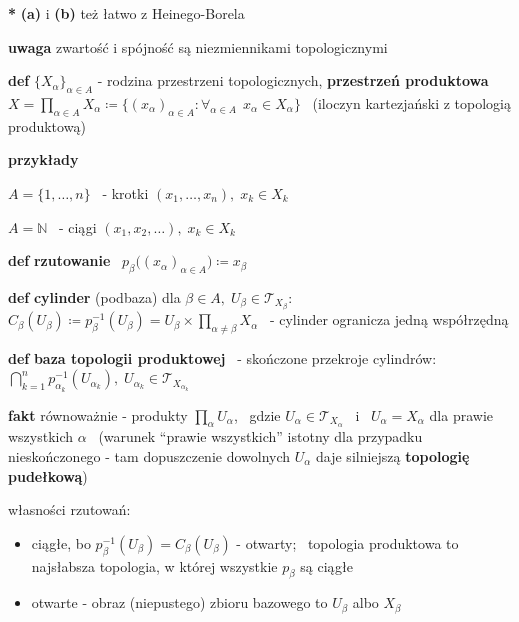 \documentclass[a4paper,12pt]{article}
\begin{document}
\bigskip
\textbf{*} \; \textbf{(a)} i \textbf{(b)} też łatwo z Heinego-Borela

\smallskip
\textbf{uwaga} \; zwartość i spójność są niezmiennikami topologicznymi


\newpage
{}

\smallskip
\textbf{def} \; \(\{X_\alpha\}_{\alpha \in A}\) - rodzina przestrzeni topologicznych, \; \textbf{przestrzeń produktowa} \, \(X = \prod_{\alpha \in A} X_\alpha \coloneqq \{(x_\alpha)_{\alpha \in A} : \forall_{\alpha \in A} \;\, x_\alpha \in X_\alpha\}\) \, (iloczyn kartezjański z topologią produktową)

\bigskip
\begin{logbox}
\textbf{przykłady}
\begin{steps}
    \item \(A = \{1, \dots, n\}\) \, - krotki \((x_1, \dots, x_n), \; x_k \in X_k\)
    \item \(A = \mathbb{N}\) \, - ciągi \((x_1, x_2, \dots), \; x_k \in X_k\)
\end{steps}
\end{logbox}

\bigskip
\textbf{def} \; \textbf{rzutowanie} \, \(p_\beta\big((x_\alpha)_{\alpha \in A}\big) \coloneqq x_\beta\)

\smallskip
\textbf{def} \; \textbf{cylinder} (podbaza) dla \(\beta \in A, \; U_\beta \in \mathcal{T}_{X_\beta}\): \, \(C_\beta(U_\beta) \coloneqq p_\beta^{-1}(U_\beta) = U_\beta \times \prod_{\alpha \neq \beta} X_\alpha\) \, - cylinder ogranicza jedną współrzędną

\smallskip
\textbf{def} \; \textbf{baza topologii produktowej} \, - skończone przekroje cylindrów: \, \(\bigcap_{k=1}^{n} p_{\alpha_k}^{-1}(U_{\alpha_k}), \; U_{\alpha_k} \in \mathcal{T}_{X_{\alpha_k}}\)

\smallskip
\textbf{fakt} \; równoważnie - produkty \(\prod_\alpha U_\alpha\), \, gdzie \(U_\alpha \in \mathcal{T}_{X_\alpha}\) \, i \, \(U_\alpha = X_\alpha\) dla prawie wszystkich \(\alpha\) \, (warunek \enquote{prawie wszystkich} istotny dla przypadku nieskończonego - tam dopuszczenie dowolnych \(U_\alpha\) daje silniejszą \textbf{topologię pudełkową})

\bigskip
własności rzutowań:
\begin{itemize}
    \item ciągłe, bo \(p_\beta^{-1}(U_\beta) = C_\beta(U_\beta)\) - otwarty; \, topologia produktowa to najsłabsza topologia, w której wszystkie \(p_\beta\) są ciągłe
    \item otwarte - obraz (niepustego) zbioru bazowego to \(U_\beta\) albo \(X_\beta\)
\end{itemize}
\end{document}
